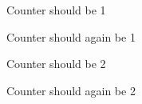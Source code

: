 \documentclass{beamer}
\begin{document}
\begin{frame}{Counter should be 1}
\end{frame}

\begin{frame}[noframenumbering]{Counter should again be 1}
\end{frame}

\begin{frame}{Counter should be 2}
\end{frame}

\begin{frame}[noframenumbering]{Counter should again be 2}
\end{frame}
\end{document}
